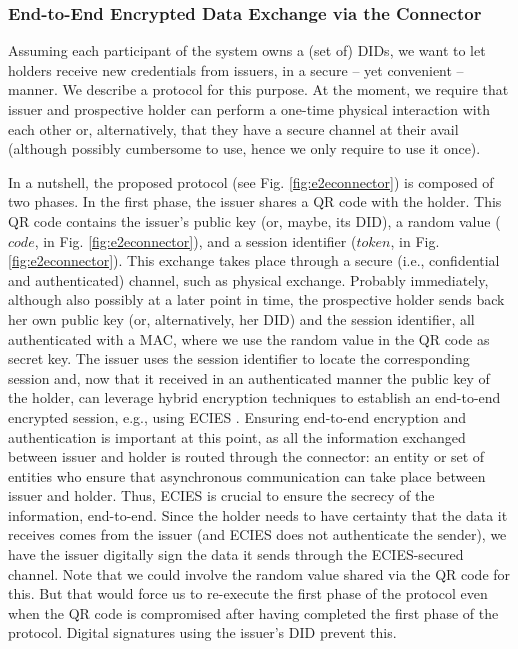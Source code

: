 \documentclass[10pt,a4paper]{article}
\newcommand{\figref}[1]{Fig. \ref{#1}}
\begin{document}
\subsubsection{End-to-End Encrypted Data Exchange via the Connector}
\label{sssec:e2eeconnector}

Assuming each participant of the system owns a (set of) DIDs, we want to let
holders receive new credentials from issuers, in a secure -- yet convenient --
manner. We describe a protocol for this purpose.  At the moment, we require
that issuer and prospective holder can perform a one-time physical interaction
with each other or, alternatively, that they have a secure channel at their
avail (although possibly cumbersome to use, hence we only require to use it
once).

In a nutshell, the proposed protocol (see \figref{fig:e2econnector}) is composed
of two phases. In the first phase, the issuer shares a QR code with the holder.
This QR code contains the issuer's public key (or, maybe, its DID), a random
value ($code$, in \figref{fig:e2econnector}), and a session identifier ($token$,
in \figref{fig:e2econnector}). This exchange takes place through a secure (i.e.,
confidential and authenticated) channel, such as physical exchange. Probably
immediately, although also possibly at a later point in time, the prospective
holder sends back her own public key (or, alternatively, her DID) and the
session identifier, all authenticated with a MAC, where we use the random value
in the QR code as secret key. The issuer uses the session identifier to locate
the corresponding session and, now that it received in an authenticated manner
the public key of the holder, can leverage hybrid encryption techniques to
establish an end-to-end encrypted session, e.g., using ECIES \cite{abr01}.
Ensuring end-to-end encryption and authentication is important at this point, as
all the information exchanged between issuer and holder is routed through the
connector: an entity or set of entities who ensure that asynchronous
communication can take place between issuer and holder. Thus, ECIES is crucial
to ensure the secrecy of the information, end-to-end. Since the holder needs to
have certainty that the data it receives comes from the issuer (and ECIES does
not authenticate the sender), we have the issuer digitally sign the data it
sends through the ECIES-secured channel. Note that we could involve the random
value shared via the QR code for this. But that would force us to re-execute the
first phase of the protocol even when the QR code is compromised after having
completed the first phase of the protocol. Digital signatures using the issuer's
DID prevent this.
\end{document}

